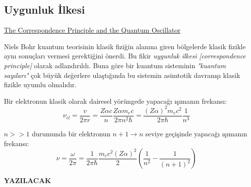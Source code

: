 \documentclass[a4paper,12pt, twoside]{article}
\newcommand{\YAZILACAK}{{\vspace{18pt}\bf\Large \color{red} YAZILACAK}}
\begin{document}
\subsection{Uygunluk İlkesi}
\href{http://hyperphysics.phy-astr.gsu.edu/hbase/quantum/hosc6.html}{The Correspondence Principle and the Quantum Oscillator}

Niels Bohr kuantum teorisinin klasik fiziğin alanına giren bölgelerde klasik fizikle aynı sonuçları vermesi gerektiğini önerdi. Bu fikir \emph{uygunluk ilkesi [correspondence principle]} olarak adlandırıldı. Buna göre bir kuantum sisteminin \emph{"kuantum sayıları"} çok büyük değerlere ulaştığında bu sistemin asimtotik davranışı klasik fizikle uyumlu olmalıdır.

Bir elektronun klasik olarak dairesel yörüngede yapacağı ışımanın frekansı:
\begin{equation}
\nu_{c l}=\frac{v}{2 \pi r}=\frac{Z \alpha c}{n} \frac{Z \alpha m_{e} c}{2 \pi n^{2} \hbar}=\frac{(Z \alpha)^{2} m_{e} c^{2}}{2 \pi \hbar} \frac{1}{n^{3}}
\end{equation}

$n>>1$ durumunda bir elektronun $n+1 \longrightarrow n$ seviye geçişinde
yapacağı ışımanın frekansı:
\begin{equation}
\nu=\frac{\omega}{2 \pi}=\frac{1}{2 \pi \hbar} \frac{m_{e} c^{2}(Z \alpha)^{2}}{2}\left(\frac{1}{n^{2}}-\frac{1}{(n+1)^{2}}\right)
\end{equation}

\YAZILACAK





\newpage
\renewcommand\refname{Kaynaklar}
{}
 
 
\end{document}
